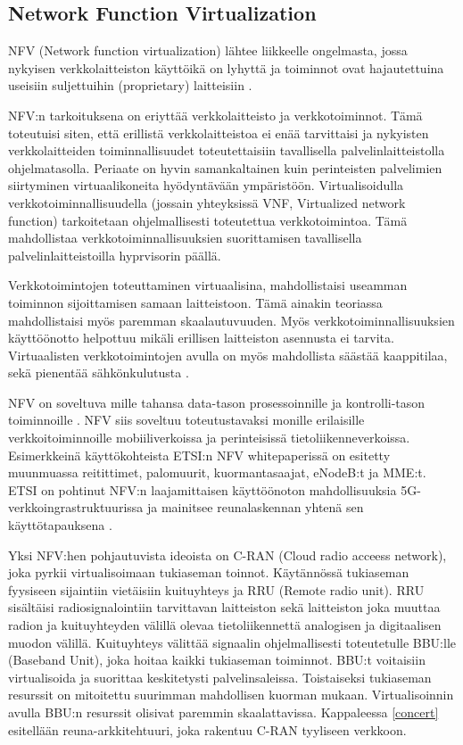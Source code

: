 \subsection{Network Function Virtualization} \label{nfv}
NFV (Network function virtualization) lähtee liikkeelle ongelmasta, jossa nykyisen verkkolaitteiston käyttöikä on lyhyttä ja toiminnot ovat hajautettuina useisiin suljettuihin (proprietary) laitteisiin \cite{nfvwhite}. 

NFV:n tarkoituksena on eriyttää verkkolaitteisto ja verkkotoiminnot. Tämä toteutuisi siten, että erillistä verkkolaitteistoa ei enää tarvittaisi ja nykyisten verkkolaitteiden toiminnallisuudet toteutettaisiin tavallisella palvelinlaitteistolla ohjelmatasolla. Periaate on hyvin samankaltainen kuin perinteisten palvelimien siirtyminen virtuaalikoneita hyödyntävään ympäristöön.
Virtualisoidulla verkkotoiminnallisuudella (jossain yhteyksissä VNF, Virtualized network function) tarkoitetaan ohjelmallisesti toteutettua verkkotoimintoa. Tämä mahdollistaa verkkotoiminnallisuuksien suorittamisen tavallisella palvelinlaitteistoilla hyprvisorin päällä. 

Verkkotoimintojen toteuttaminen virtuaalisina, mahdollistaisi useamman toiminnon sijoittamisen samaan laitteistoon. Tämä ainakin teoriassa mahdollistaisi myös paremman skaalautuvuuden. Myös verkkotoiminnallisuuksien käyttöönotto helpottuu mikäli erillisen laitteiston asennusta ei tarvita. Virtuaalisten verkkotoimintojen avulla on myös mahdollista säästää kaappitilaa, sekä pienentää sähkönkulutusta \cite{nfvedge}.

NFV on soveltuva mille tahansa data-tason prosessoinnille ja kontrolli-tason toiminnoille \cite{nfvwhite}. NFV siis soveltuu toteutustavaksi monille erilaisille verkkoitoiminnoille mobiiliverkoissa ja perinteisissä tietoliikenneverkoissa. Esimerkkeinä käyttökohteista ETSI:n NFV whitepaperissä on esitetty muunmuassa reitittimet, palomuurit, kuormantasaajat, eNodeB:t ja MME:t. ETSI on pohtinut NFV:n laajamittaisen käyttöönoton mahdollisuuksia 5G-verkkoingrastruktuurissa ja mainitsee reunalaskennan yhtenä sen käyttötapauksena \cite{etsinfv5g}.

Yksi NFV:hen pohjautuvista ideoista on C-RAN (Cloud radio acceess network), joka pyrkii virtualisoimaan tukiaseman toinnot. Käytännössä tukiaseman fyysiseen sijaintiin vietäisiin kuituyhteys ja RRU (Remote radio unit).
RRU sisältäisi radiosignalointiin tarvittavan laitteiston sekä laitteiston joka muuttaa radion ja kuituyhteyden välillä olevaa tietoliikennettä analogisen ja digitaalisen muodon välillä.
Kuituyhteys välittää signaalin ohjelmallisesti toteutetulle BBU:lle (Baseband Unit), joka hoitaa kaikki tukiaseman toiminnot\cite{chih2014recent}.
BBU:t voitaisiin virtualisoida ja suorittaa keskitetysti palvelinsaleissa.
Toistaiseksi tukiaseman resurssit on mitoitettu suurimman mahdollisen kuorman mukaan. Virtualisoinnin avulla BBU:n resurssit olisivat paremmin skaalattavissa.
Kappaleessa \ref{concert} esitellään reuna-arkkitehtuuri, joka rakentuu C-RAN tyyliseen verkkoon.

